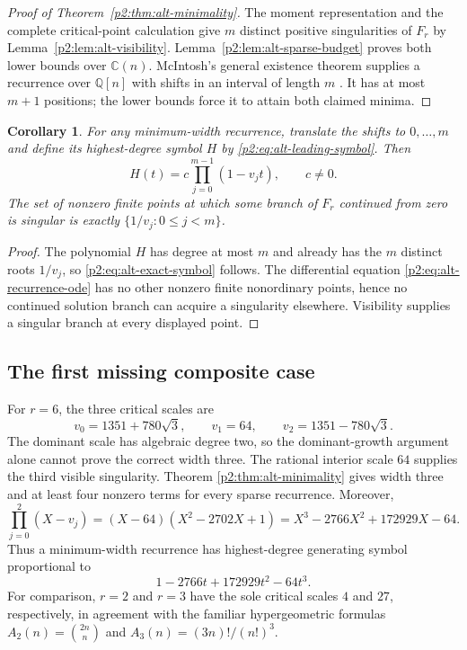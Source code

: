 \documentclass[11pt,a4paper]{article}
\newtheorem{corollary}[theorem]{Corollary}
\theoremstyle{definition}
\theoremstyle{remark}
\numberwithin{equation}{section}
\begin{document}
\begin{proof}[Proof of Theorem~\ref{p2:thm:alt-minimality}]
The moment representation and the complete critical-point calculation
give $m$ distinct positive singularities of $F_r$ by
Lemma~\ref{p2:lem:alt-visibility}. Lemma~\ref{p2:lem:alt-sparse-budget}
proves both lower bounds over $\mathbb C(n)$. McIntosh's general
existence theorem supplies a recurrence over $\mathbb Q[n]$ with shifts
in an interval of length $m$ \cite[Theorem~1]{p3:McIntosh1993}. It has at
most $m+1$ positions; the lower bounds force it to attain both claimed
minima.
\end{proof}

\begin{corollary}\label{p2:cor:alt-symbol}
For any minimum-width recurrence, translate the shifts to
$0,\ldots,m$ and define its highest-degree symbol $H$ by
\eqref{p2:eq:alt-leading-symbol}. Then
\begin{equation}\label{p2:eq:alt-exact-symbol}
 H(t)=c\prod_{j=0}^{m-1}(1-v_jt),\qquad c\ne0.
\end{equation}
The set of nonzero finite points at which some branch of $F_r$
continued from zero is singular is exactly $\{1/v_j:0\leq j<m\}$.
\end{corollary}

\begin{proof}
The polynomial $H$ has degree at most $m$ and already has the $m$
distinct roots $1/v_j$, so \eqref{p2:eq:alt-exact-symbol} follows.
The differential equation \eqref{p2:eq:alt-recurrence-ode} has no other
nonzero finite nonordinary points, hence no continued solution branch
can acquire a singularity elsewhere. Visibility supplies a singular
branch at every displayed point.
\end{proof}

\subsection{The first missing composite case}

For $r=6$, the three critical scales are
\[
 v_0=1351+780\sqrt3,\qquad v_1=64,\qquad
 v_2=1351-780\sqrt3.
\]
The dominant scale has algebraic degree two, so the dominant-growth
argument alone cannot prove the correct width three. The rational
interior scale $64$ supplies the third visible singularity. Theorem
\ref{p2:thm:alt-minimality} gives width three and at least four nonzero
terms for every sparse recurrence. Moreover,
\[
 \prod_{j=0}^{2}(X-v_j)
 =(X-64)(X^2-2702X+1)
 =X^3-2766X^2+172929X-64.
\]
Thus a minimum-width recurrence has highest-degree generating symbol
proportional to
\[
 1-2766t+172929t^2-64t^3.
\]
For comparison, $r=2$ and $r=3$ have the sole critical scales $4$ and
$27$, respectively, in agreement with the familiar hypergeometric
formulas $A_2(n)=\binom{2n}{n}$ and $A_3(n)=(3n)!/(n!)^3$.
\end{document}
